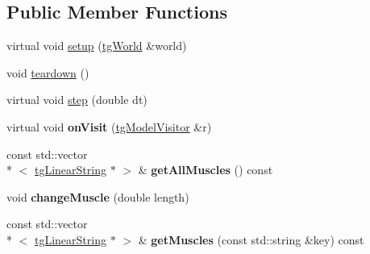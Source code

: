 \subsection*{Public Member Functions}
\begin{DoxyCompactItemize}
\item 
virtual void \hyperlink{class_spiral_spine_a375666b36e080f35dab35ebea12117a9}{setup} (\hyperlink{classtg_world}{tg\-World} \&world)
\item 
void \hyperlink{class_spiral_spine_a72bb17d2fabd672ae79dcd80c598303a}{teardown} ()
\item 
virtual void \hyperlink{class_spiral_spine_aec58e69f08f72da5806c104a77e69db1}{step} (double dt)
\item 
\hypertarget{class_spiral_spine_a1e5dd7c8cd18828959a4d0768d8effa4}{virtual void {\bfseries on\-Visit} (\hyperlink{classtg_model_visitor}{tg\-Model\-Visitor} \&r)}\label{class_spiral_spine_a1e5dd7c8cd18828959a4d0768d8effa4}

\item 
\hypertarget{class_spiral_spine_ad4af0c3c9ac313c137b75e6e58fa08a3}{const std\-::vector\\*
$<$ \hyperlink{classtg_linear_string}{tg\-Linear\-String} $\ast$ $>$ \& {\bfseries get\-All\-Muscles} () const }\label{class_spiral_spine_ad4af0c3c9ac313c137b75e6e58fa08a3}

\item 
\hypertarget{class_spiral_spine_ab04964d0e347dbcbf1ca41b1d6eceabc}{void {\bfseries change\-Muscle} (double length)}\label{class_spiral_spine_ab04964d0e347dbcbf1ca41b1d6eceabc}

\item 
\hypertarget{class_spiral_spine_a63144197479186e2ce074490b4833409}{const std\-::vector\\*
$<$ \hyperlink{classtg_linear_string}{tg\-Linear\-String} $\ast$ $>$ \& {\bfseries get\-Muscles} (const std\-::string \&key) const }\label{class_spiral_spine_a63144197479186e2ce074490b4833409}


\end{DoxyCompactItemize}
